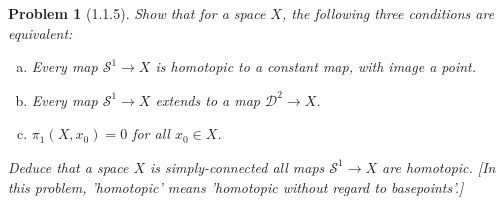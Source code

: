 \documentclass[11pt, a4paper, final]{amsart}
\newcommand{\sphere}{\mathcal{S}}
\newcommand{\disk}{\mathcal{D}}
\numberwithin{theorem}{section}
\newtheorem{problem}[theorem]{Problem}
\theoremstyle{definition}
\theoremstyle{remark}
\begin{document}
\begin{problem}[1.1.5]\label{problem: 1.1.5.}
    Show that for a space \(X\), the following three conditions are equivalent:
    \begin{enumerate}[(a)]
        \item Every map \( \sphere^1 \longrightarrow X\) is homotopic to a constant map, with image a point.
        \item Every map \(\sphere^1 \longrightarrow X\) extends to a map \(\disk^2 \longrightarrow X\).
        \item \( \pi_1(X, x_0) = 0 \) for all \( x_0 \in X\).
    \end{enumerate}
    Deduce that a space \(X\) is simply-connected all maps \(\sphere^1 \longrightarrow X\) are homotopic. [In this problem, 'homotopic' means 'homotopic without regard to basepoints'.]
\end{problem}
\end{document}
